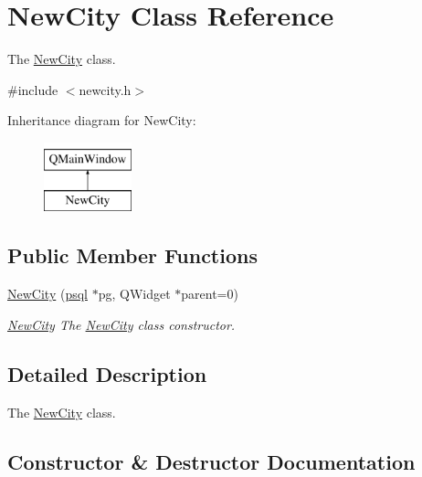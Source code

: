 \hypertarget{class_new_city}{}\section{New\+City Class Reference}
\label{class_new_city}


The \hyperlink{class_new_city}{New\+City} class.  




{\ttfamily \#include $<$newcity.\+h$>$}

Inheritance diagram for New\+City\+:\begin{figure}[H]
\begin{center}
\leavevmode
\includegraphics[height=2.000000cm]{class_new_city}
\end{center}
\end{figure}
\subsection*{Public Member Functions}
\begin{DoxyCompactItemize}
\item 
\hyperlink{class_new_city_a79afb3ddc8406719c6fb58e16dbe2953}{New\+City} (\hyperlink{classpsql}{psql} $\ast$pg, Q\+Widget $\ast$parent=0)
\begin{DoxyCompactList}\small\item\em \hyperlink{class_new_city}{New\+City} The \hyperlink{class_new_city}{New\+City} class constructor. \end{DoxyCompactList}\end{DoxyCompactItemize}


\subsection{Detailed Description}
The \hyperlink{class_new_city}{New\+City} class. 

\subsection{Constructor \& Destructor Documentation}
\mbox{\label{class_new_city_a79afb3ddc8406719c6fb58e16dbe2953}} 
